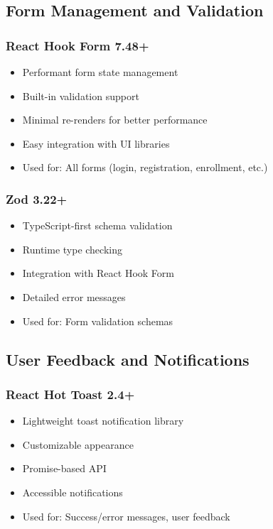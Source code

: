 \documentclass[12pt,a4paper]{report}
\begin{document}
\subsection{Form Management and Validation}

\subsubsection{React Hook Form 7.48+}
\begin{itemize}[leftmargin=*]
    \item Performant form state management
    \item Built-in validation support
    \item Minimal re-renders for better performance
    \item Easy integration with UI libraries
    \item Used for: All forms (login, registration, enrollment, etc.)
\end{itemize}

\subsubsection{Zod 3.22+}
\begin{itemize}[leftmargin=*]
    \item TypeScript-first schema validation
    \item Runtime type checking
    \item Integration with React Hook Form
    \item Detailed error messages
    \item Used for: Form validation schemas
\end{itemize}

\subsection{User Feedback and Notifications}

\subsubsection{React Hot Toast 2.4+}
\begin{itemize}[leftmargin=*]
    \item Lightweight toast notification library
    \item Customizable appearance
    \item Promise-based API
    \item Accessible notifications
    \item Used for: Success/error messages, user feedback
\end{itemize}
\end{document}
